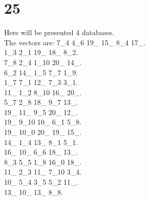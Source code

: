 \chapter{25}
\indent Here will be presented 4 databases.\\
The vectors are:
7\_4 4\_6 19\_ 15\_ 8\_4 17\_.\\1\_3 2\_1 19\_ 18\_ 8\_2.\\7\_8 2\_4 1\_10 20\_ 14\_.\\6\_2 14\_ 1\_5 7\_7 1\_9.\\1\_7 7\_1 12\_ 7\_3 3\_1.\\11\_ 1\_2 8\_10 16\_ 20\_.\\5\_7 2\_8 18\_ 9\_7 13\_.\\19\_ 11\_ 9\_5 20\_ 12\_.\\19\_ 9\_10 10\_ 6\_1 5\_8.\\19\_ 10\_0 20\_ 19\_ 15\_.\\14\_ 1\_4 13\_ 8\_1 5\_1.\\16\_ 10\_ 6\_6 18\_ 13\_.\\8\_3 5\_5 1\_8 16\_0 18\_.\\11\_ 2\_3 11\_ 7\_10 3\_4.\\10\_ 5\_4 3\_5 5\_2 11\_.\\13\_ 10\_ 13\_ 8\_8.\\